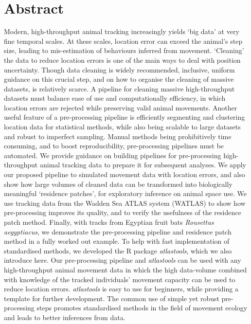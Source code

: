 \section*{Abstract}
    Modern, high-throughput animal tracking increasingly yields `big data' at very fine temporal scales. 
    At these scales, location error can exceed the animal's step size, leading to mis-estimation of behaviours inferred from movement. 
    `Cleaning' the data to reduce location errors is one of the main ways to deal with position uncertainty. 
    Though data cleaning is widely recommended, inclusive, uniform guidance on this crucial step, and on how to organise the cleaning of massive datasets, is relatively scarce.
    A pipeline for cleaning massive high-throughput datasets must balance ease of use and computationally efficiency, in which location errors are rejected while preserving valid animal movements. 
    Another useful feature of a pre-processing pipeline is efficiently segmenting and clustering location data for statistical methods, while also being scalable to large datasets and robust to imperfect sampling. 
    Manual methods being prohibitively time consuming, and to boost reproducibility, pre-processing pipelines must be automated.
    We provide guidance on building pipelines for pre-processing high-throughput animal tracking data to prepare it for subsequent analyses. 
    We apply our proposed pipeline to simulated movement data with location errors, and also show how large volumes of cleaned data can be transformed into biologically meaningful `residence patches', for exploratory inference on animal space use. 
    We use tracking data from the Wadden Sea ATLAS system (WATLAS) to show how pre-processing improves its quality, and to verify the usefulness of the residence patch method. 
    Finally, with tracks from Egyptian fruit bats \textit{Rousettus aegyptiacus}, we demonstrate the pre-processing pipeline and residence patch method in a fully worked out example.
    To help with fast implementation of standardised methods, we developed the R package \textit{atlastools}, which we also introduce here. 
    Our pre-processing pipeline and \textit{atlastools} can be used with any high-throughput animal movement data in which the high data-volume combined with knowledge of the tracked individuals’ movement capacity can be used to reduce location errors. 
    \textit{atlastools} is easy to use for beginners, while providing a template for further development. 
    The common use of simple yet robust pre-processing steps promotes standardised methods in the field of movement ecology and leads to better inferences from data.


